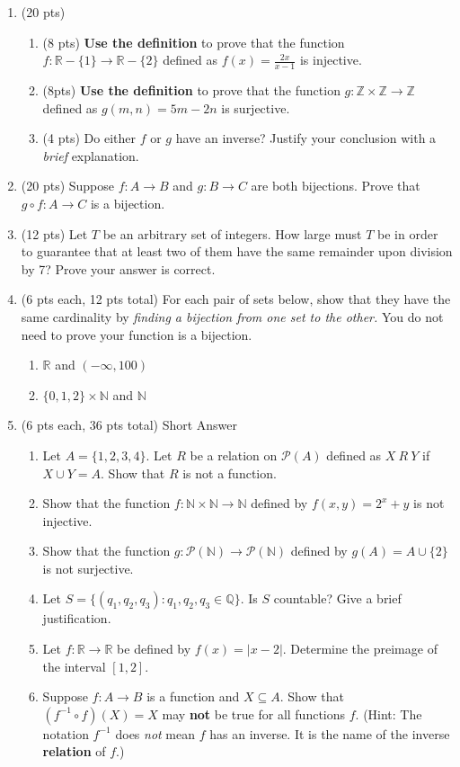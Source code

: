 \documentclass[11pt]{article}
\newcommand{\R}{{\mathbb{R}}}
\newcommand{\Z}{{\mathbb{Z}}}
\newcommand{\Q}{{\mathbb{Q}}}
\newcommand{\N}{{\mathbb{N}}}
\begin{document}
\newpage
\begin{enumerate}
\item (20 pts)
	\begin{enumerate}
	\item (8 pts) \textbf{Use the definition} to prove that the function $f: \R -\{1\} \to \R -\{2\}$ defined as $f(x)=\frac{2x}{x-1}$ is injective.
	\vfill
	\item (8pts) \textbf{Use the definition} to prove that the function $g: \Z \times \Z \to \Z$ defined as $g(m,n)=5m-2n$ is surjective.
	\vfill
	\item (4 pts) Do either $f$ or $g$ have an inverse? Justify your conclusion with a \emph{brief} explanation.
	\vspace{1in}
	\end{enumerate}
\newpage
\item (20 pts) Suppose $f:A \to B$ and $g: B \to C$ are both bijections. Prove that $g\circ f: A \to C$ is a bijection.

\newpage
 \item (12 pts) Let $T$ be an arbitrary set of integers. How large must $T$ be in order to guarantee that at least two of them have the same remainder upon division by 7? Prove your answer is correct.
 \newpage
 \item (6 pts each, 12 pts total) For each pair of sets below, show that they have the same cardinality by \emph{finding a bijection from one set to the other.} You do not need to prove your function is a bijection.
 	\begin{enumerate}
	\item $\R$ and $(-\infty, 100)$
	\vfill
	\item $\{0,1,2\} \times \N$ and $\N$
	\vfill
	\end{enumerate}
\item (6 pts each, 36 pts total) Short Answer
	\begin{enumerate}
	\item Let $A=\{1,2,3,4\}$. Let $R$ be a relation on $\mathcal{P}(A)$ defined as $X \: R \: Y$ if $X \cup Y = A.$ Show that $R$ is not a function.
	\vfill
	\item Show that the function $f: \N \times \N \to \N$ defined by $f(x,y)=2^x+y$ is not injective.
	\vfill
	\newpage
	\item Show that the function $g: \mathcal{P}(\N) \to \mathcal{P}(\N)$ defined by $g(A)=A \cup \{2\}$ is not surjective.
	\vfill
	\item Let $S=\{ (q_1,q_2,q_3) : q_1,q_2,q_3 \in \Q\}$. Is $S$ countable? Give a brief justification.
	\vfill
	\item Let $f:\R \to \R$ be defined by $f(x)=|x-2|.$ Determine the preimage of the interval $[1,2].$
	\vfill
	\item Suppose $f:A \to B$ is a function and $X \subseteq A.$ Show that $(f^{-1}\circ f) (X) = X$ may \textbf{not} be true for all functions $f$. (Hint: The notation $f^{-1}$ does \emph{not} mean $f$ has an inverse. It is the name of the inverse \textbf{relation} of $f$.)
	\vfill
	\end{enumerate}
\end{enumerate}
\end{document}

